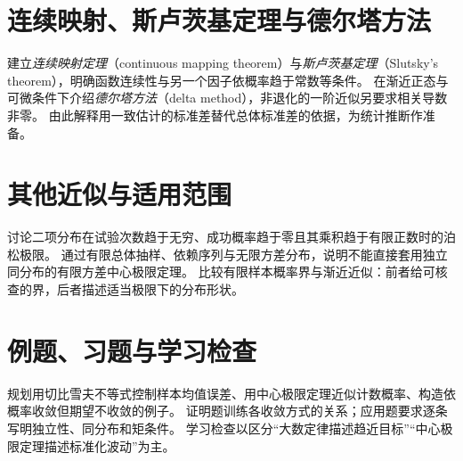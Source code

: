 \section{连续映射、斯卢茨基定理与德尔塔方法}
\label{sec:ps-asymptotic-tools}
建立\emph{连续映射定理}（continuous mapping theorem）与\emph{斯卢茨基定理}（Slutsky's theorem），明确函数连续性与另一个因子依概率趋于常数等条件。
在渐近正态与可微条件下介绍\emph{德尔塔方法}（delta method），非退化的一阶近似另要求相关导数非零。
由此解释用一致估计的标准差替代总体标准差的依据，为统计推断作准备。

\section{其他近似与适用范围}
\label{sec:ps-approximation-boundaries}
讨论二项分布在试验次数趋于无穷、成功概率趋于零且其乘积趋于有限正数时的泊松极限。
通过有限总体抽样、依赖序列与无限方差分布，说明不能直接套用独立同分布的有限方差中心极限定理。
比较有限样本概率界与渐近近似：前者给可核查的界，后者描述适当极限下的分布形状。

\section{例题、习题与学习检查}
规划用切比雪夫不等式控制样本均值误差、用中心极限定理近似计数概率、构造依概率收敛但期望不收敛的例子。
证明题训练各收敛方式的关系；应用题要求逐条写明独立性、同分布和矩条件。
学习检查以区分“大数定律描述趋近目标”“中心极限定理描述标准化波动”为主。





